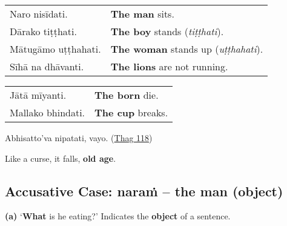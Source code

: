 \documentclass[11pt,oneside]{memoir}
\begin{document}
\bigskip

\begin{widecols}


\begin{center}
\begin{tabular}{ll}
Naro nisīdati. & \textbf{The man} sits.\\[0pt]
Dārako tiṭṭhati. & \textbf{The boy} stands (\emph{tiṭṭhati}).\\[0pt]
Mātugāmo uṭṭhahati. & \textbf{The woman} stands up (\emph{uṭṭhahati}).\\[0pt]
Sīhā na dhāvanti. & \textbf{The lions} are not running.\\[0pt]
\end{tabular}
\end{center}

\columnbreak

\begin{center}
\begin{tabular}{ll}
Jātā mīyanti. & \textbf{The born} die.\\[0pt]
Mallako bhindati. & \textbf{The cup} breaks.\\[0pt]
\end{tabular}
\end{center}

{\centering

Abhisatto'va nipatati, vayo. (\href{https://suttacentral.net/thag1.118/pli/ms}{Thag 118})

Like a curse, it falls, \textbf{old age}.

\par}
\end{widecols}

\clearpage

\subsection{Accusative Case: naraṁ -- the man (object)}
\label{sec:orgea1fbef}

\textbf{(a)} `\textbf{What} is he eating?' Indicates the \textbf{object} of a sentence.

\renewcommand{\arraystretch}{1.8}
\end{document}
